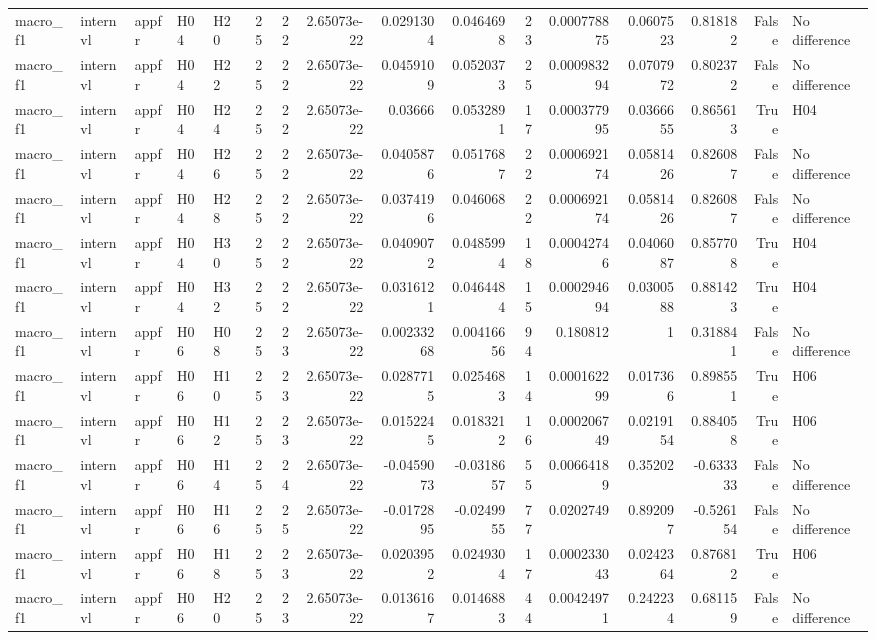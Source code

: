 \begin{longtable}{lllllrrrrrrrrrrl}
macro\_f1 & internvl & appfr & H04 & H20 & 25 & 22 & 2.65073e-22 & 0.0291304 & 0.0464698 & 23 & 0.000778875 & 0.0607523 & 0.818182 & False & No difference \\
macro\_f1 & internvl & appfr & H04 & H22 & 25 & 22 & 2.65073e-22 & 0.0459109 & 0.0520373 & 25 & 0.000983294 & 0.0707972 & 0.802372 & False & No difference \\
macro\_f1 & internvl & appfr & H04 & H24 & 25 & 22 & 2.65073e-22 & 0.03666 & 0.0532891 & 17 & 0.000377995 & 0.0366655 & 0.865613 & True & H04 \\
macro\_f1 & internvl & appfr & H04 & H26 & 25 & 22 & 2.65073e-22 & 0.0405876 & 0.0517687 & 22 & 0.000692174 & 0.0581426 & 0.826087 & False & No difference \\
macro\_f1 & internvl & appfr & H04 & H28 & 25 & 22 & 2.65073e-22 & 0.0374196 & 0.046068 & 22 & 0.000692174 & 0.0581426 & 0.826087 & False & No difference \\
macro\_f1 & internvl & appfr & H04 & H30 & 25 & 22 & 2.65073e-22 & 0.0409072 & 0.0485994 & 18 & 0.00042746 & 0.0406087 & 0.857708 & True & H04 \\
macro\_f1 & internvl & appfr & H04 & H32 & 25 & 22 & 2.65073e-22 & 0.0316121 & 0.0464484 & 15 & 0.000294694 & 0.0300588 & 0.881423 & True & H04 \\
macro\_f1 & internvl & appfr & H06 & H08 & 25 & 23 & 2.65073e-22 & 0.00233268 & 0.00416656 & 94 & 0.180812 & 1 & 0.318841 & False & No difference \\
macro\_f1 & internvl & appfr & H06 & H10 & 25 & 23 & 2.65073e-22 & 0.0287715 & 0.0254683 & 14 & 0.000162299 & 0.017366 & 0.898551 & True & H06 \\
macro\_f1 & internvl & appfr & H06 & H12 & 25 & 23 & 2.65073e-22 & 0.0152245 & 0.0183212 & 16 & 0.000206749 & 0.0219154 & 0.884058 & True & H06 \\
macro\_f1 & internvl & appfr & H06 & H14 & 25 & 24 & 2.65073e-22 & -0.0459073 & -0.0318657 & 55 & 0.00664189 & 0.35202 & -0.633333 & False & No difference \\
macro\_f1 & internvl & appfr & H06 & H16 & 25 & 25 & 2.65073e-22 & -0.0172895 & -0.0249955 & 77 & 0.0202749 & 0.892097 & -0.526154 & False & No difference \\
macro\_f1 & internvl & appfr & H06 & H18 & 25 & 23 & 2.65073e-22 & 0.0203952 & 0.0249304 & 17 & 0.000233043 & 0.0242364 & 0.876812 & True & H06 \\
macro\_f1 & internvl & appfr & H06 & H20 & 25 & 23 & 2.65073e-22 & 0.0136167 & 0.0146883 & 44 & 0.00424971 & 0.242234 & 0.681159 & False & No difference \\

\end{longtable}
